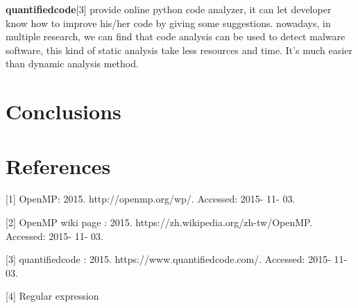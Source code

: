 \documentclass{acm_proc_article-sp}
\begin{document}
	\textbf{quantifiedcode}[3] provide online python code analyzer, it can let developer 
	know how to improve his/her code by giving some suggestions.
	nowadays, in multiple research, we can find that code analysis can be used to 
	detect malware software, this kind of static analysis take less resources and time. 
	It’s much easier than dynamic analysis method.

\section{Conclusions}


\section{References}
[1] OpenMP: 2015. http://openmp.org/wp/. Accessed: 2015- 11- 03.

[2] OpenMP wiki page : 2015. https://zh.wikipedia.org/zh-tw/OpenMP. Accessed: 2015- 11- 03.

[3] quantifiedcode : 2015. https://www.quantifiedcode.com/. Accessed: 2015- 11- 03.

[4] Regular expression
\end{document}
